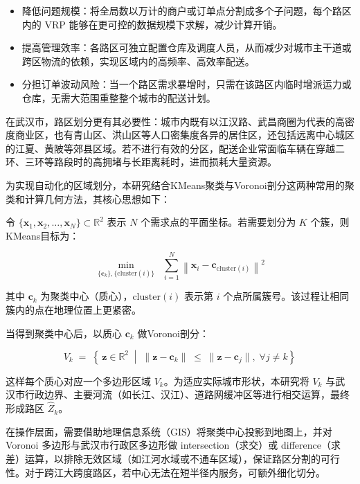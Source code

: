 \documentclass[12pt,a4paper,twoside]{ctexbook}
\begin{document}
\begin{itemize}
\item 降低问题规模：将全局数以万计的商户或订单点分割成多个子问题，每个路区内的 VRP 能够在更可控的数据规模下求解，减少计算开销。

\item 提高管理效率：各路区可独立配置仓库及调度人员，从而减少对城市主干道或跨区物流的依赖，实现区域内的高频率、高效率配送。

\item 分担订单波动风险：当一个路区需求暴增时，只需在该路区内临时增派运力或仓库，无需大范围重整整个城市的配送计划\cite{3}。
\end{itemize}

在武汉市，路区划分更有其必要性：城市内既有以江汉路、武昌商圈为代表的高密度商业区，也有青山区、洪山区等人口密集度各异的居住区，还包括远离中心城区的江夏、黄陂等郊县区域。若不进行有效的分区，配送企业常面临车辆在穿越二环、三环等路段时的高拥堵与长距离耗时，进而损耗大量资源。

为实现自动化的区域划分，本研究结合KMeans聚类与Voronoi剖分这两种常用的聚类和计算几何方法，其核心思想如下：

令 $\{ \mathbf{x}_1, \mathbf{x}_2, \dots, \mathbf{x}_N \}\subset \mathbb{R}^2$ 表示 $N$ 个需求点的平面坐标。若需要划分为 $K$ 个簇，则KMeans目标为：

\begin{equation}\label{eq:2.1}
\min_{\{\mathbf{c}_k\}, \{\mathrm{cluster}(i)\}} \;\; \sum_{i=1}^{N} \left\| \mathbf{x}_i - \mathbf{c}_{\mathrm{cluster}(i)} \right\|^2
\end{equation}

其中 $\mathbf{c}_k$ 为聚类中心（质心），$\mathrm{cluster}(i)$ 表示第 $i$ 个点所属簇号。该过程让相同簇内的点在地理位置上更紧密。

当得到聚类中心后，以质心 $\mathbf{c}_k$ 做Voronoi剖分：

\begin{equation}\label{eq:2.2}
V_k \;=\; \left\{\, \mathbf{z}\in \mathbb{R}^2 \;\middle|\; \|\mathbf{z} - \mathbf{c}_k\|\;\le\;\|\mathbf{z} - \mathbf{c}_j\|, \;\forall j\neq k \right\}
\end{equation}

这样每个质心对应一个多边形区域 $V_k$。为适应实际城市形状，本研究将 $V_k$ 与武汉市行政边界、主要河流（如长江、汉江）、道路网缓冲区等进行相交运算，最终形成路区 $\hat{Z}_k$。

在操作层面，需要借助地理信息系统（GIS）将聚类中心投影到地图上，并对 Voronoi 多边形与武汉市行政区多边形做 intersection（求交）或 difference（求差）运算，以排除无效区域（如江河水域或不通车区域），保证路区分割的可行性\cite{4}。对于跨江大跨度路区，若中心无法在短半径内服务，可额外细化切分。
\end{document}
